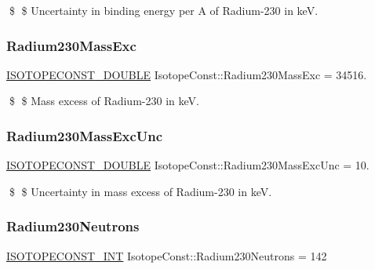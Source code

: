 \$ \$ Uncertainty in binding energy per A of Radium-\/230 in keV. \mbox{\label{group___isotope_const-_radium-_ra230_gae24ce4a894f956c35f1fc761cb56ca8d}} 
\subsubsection{\texorpdfstring{Radium230\+Mass\+Exc}{Radium230MassExc}}
{\footnotesize\ttfamily \mbox{\hyperlink{group___isotope_const-_macros_ga8f45a7272ce02c0b4c65c44636ed719a}{I\+S\+O\+T\+O\+P\+E\+C\+O\+N\+S\+T\+\_\+\+D\+O\+U\+B\+LE}} Isotope\+Const\+::\+Radium230\+Mass\+Exc = 34516.}

\$ \$ Mass excess of Radium-\/230 in keV. \mbox{\label{group___isotope_const-_radium-_ra230_ga640f42b4c6a430ed368ffe18193336a7}} 
\subsubsection{\texorpdfstring{Radium230\+Mass\+Exc\+Unc}{Radium230MassExcUnc}}
{\footnotesize\ttfamily \mbox{\hyperlink{group___isotope_const-_macros_ga8f45a7272ce02c0b4c65c44636ed719a}{I\+S\+O\+T\+O\+P\+E\+C\+O\+N\+S\+T\+\_\+\+D\+O\+U\+B\+LE}} Isotope\+Const\+::\+Radium230\+Mass\+Exc\+Unc = 10.}

\$ \$ Uncertainty in mass excess of Radium-\/230 in keV. \mbox{\label{group___isotope_const-_radium-_ra230_ga149ea5a163f44173d4a7c3643fe4dbc2}} 
\subsubsection{\texorpdfstring{Radium230\+Neutrons}{Radium230Neutrons}}
{\footnotesize\ttfamily \mbox{\hyperlink{group___isotope_const-_macros_ga5f18360b3e99483a35c32d789e62621c}{I\+S\+O\+T\+O\+P\+E\+C\+O\+N\+S\+T\+\_\+\+I\+NT}} Isotope\+Const\+::\+Radium230\+Neutrons = 142}

